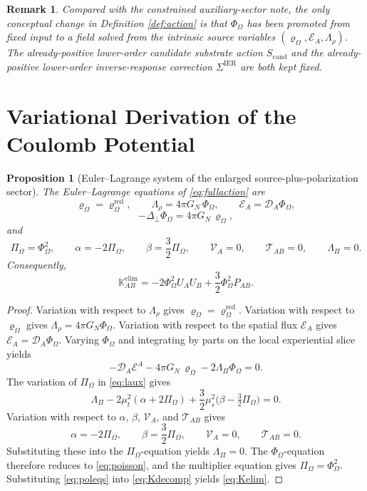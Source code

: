 \documentclass[11pt]{article}
\newcommand{\ProjSub}{P}
\newcommand{\SpatialD}{\mathcal D}
\newcommand{\LapPerp}{\Delta_\perp}
\newcommand{\FlowPot}{\Phi_\Omega}
\newcommand{\BalanceField}{\Pi_\Omega}
\newcommand{\BalMult}{\Lambda_\Pi}
\newcommand{\SourceDensity}{\varrho_\Omega}
\newcommand{\SourceDensityRed}{\varrho_\Omega^{\mathrm{red}}}
\newcommand{\SourceMult}{\Lambda_\rho}
\newcommand{\SourceFlux}{\mathcal E}
\newcommand{\SigmaIER}{\Sigma^{\mathrm{IER}}}
\newcommand{\AuxPol}{\mathbb K}
\newcommand{\CandAction}{S_{\mathrm{cand}}}
\newtheorem{proposition}{Proposition}
\newtheorem{remark}{Remark}
\begin{document}
\begin{remark}
Compared with the constrained auxiliary-sector note, the only conceptual change in Definition \ref{def:action} is that \(\FlowPot\) has been promoted from fixed input to a field solved from the intrinsic source variables \((\SourceDensity,\SourceFlux_A,\SourceMult)\). The already-positive lower-order candidate substrate action \(\CandAction\) and the already-positive lower-order inverse-response correction \(\SigmaIER\) are both kept fixed.
\end{remark}

\section{Variational Derivation of the Coulomb Potential}

\begin{proposition}[Euler--Lagrange system of the enlarged source-plus-polarization sector]
\label{prop:EL}
The Euler--Lagrange equations of \eqref{eq:fullaction} are
\begin{equation}
\SourceDensity=\SourceDensityRed,
\qquad
\SourceMult=4\pi G_N\,\FlowPot,
\qquad
\SourceFlux_A=\SpatialD_A\FlowPot,
\label{eq:sourceeqs}
\end{equation}
\begin{equation}
-\LapPerp \FlowPot=4\pi G_N\,\SourceDensity,
\label{eq:poisson}
\end{equation}
and
\begin{equation}
\BalanceField=\FlowPot^2,
\qquad
\alpha=-2\BalanceField,
\qquad
\beta=\frac32\BalanceField,
\qquad
\mathcal V_A=0,
\qquad
\mathcal T_{AB}=0,
\qquad
\BalMult=0.
\label{eq:poleqs}
\end{equation}
Consequently,
\begin{equation}
\AuxPol_{AB}^{\mathrm{elim}}
=
-2\FlowPot^2U_AU_B
+\frac32\FlowPot^2\ProjSub_{AB}.
\label{eq:Kelim}
\end{equation}
\end{proposition}

\begin{proof}
Variation with respect to \(\SourceMult\) gives \(\SourceDensity=\SourceDensityRed\). Variation with respect to \(\SourceDensity\) gives \(\SourceMult=4\pi G_N\FlowPot\). Variation with respect to the spatial flux \(\SourceFlux_A\) gives \(\SourceFlux_A=\SpatialD_A\FlowPot\). Varying \(\FlowPot\) and integrating by parts on the local experiential slice yields
\[
-\SpatialD_A\SourceFlux^A-4\pi G_N\,\SourceDensity-2\BalMult\FlowPot=0.
\]
The variation of \(\BalanceField\) in \eqref{eq:laux} gives
\[
\BalMult
-2\mu_t^2(\alpha+2\BalanceField)
+\frac32\mu_s^2\bigl(\beta-\tfrac32\BalanceField\bigr)=0.
\]
Variation with respect to \(\alpha\), \(\beta\), \(\mathcal V_A\), and \(\mathcal T_{AB}\) gives
\[
\alpha=-2\BalanceField,
\qquad
\beta=\frac32\BalanceField,
\qquad
\mathcal V_A=0,
\qquad
\mathcal T_{AB}=0.
\]
Substituting these into the \(\BalanceField\)-equation yields \(\BalMult=0\). The \(\FlowPot\)-equation therefore reduces to \eqref{eq:poisson}, and the multiplier equation gives \(\BalanceField=\FlowPot^2\). Substituting \eqref{eq:poleqs} into \eqref{eq:Kdecomp} yields \eqref{eq:Kelim}.
\end{proof}
\end{document}

